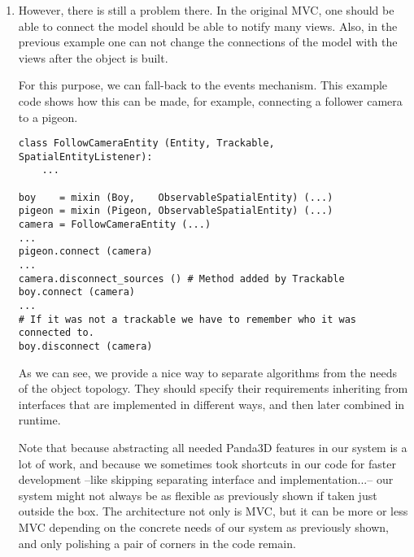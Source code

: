 \documentclass[a4paper,10pt]{article}
\begin{document}
\begin{enumerate}
  But, as the previous code shows, one can build the desired class on
  runtime mixing the needed entity components. For this, we provide
  the utility function \texttt{mixin} that creates a new class from a
  set of bases. For example, this code could be valid\footnote{We do
    not implement networked game, so some of the classes described are
    ficticious.}:

{\footnotesize
\begin{verbatim}
if game_is_local:
    pigeon = mixin (BoidEntity, DynamicPhysicalEntity, ActorEntity) (...)
elif game_is_client:
    pigeon = mixin (ActorEntity, RemotePhysicalEntity) (...)
elif game_is_server:
    pigeon = mixin (BoidEntity, DynamicPhysicalEntity, ServerPhysicalEntity) (...)
pigeon.set_position (100, 100, 100)
\end{verbatim}
}

In that way, the \emph{call-next-method} mechanism would make sure
that when a manipulation method is called on this model+view mixin
object it propagates correctly through all the hierarchy notifying the
views.

\item However, there is still a problem there. In the original MVC,
  one should be able to connect the model should be able to notify
  many views. Also, in the previous example one can not change the
  connections of the model with the views after the object is built.

  For this purpose, we can fall-back to the events mechanism. This
  example code shows how this can be made, for example, connecting a
  follower camera to a pigeon.

{\footnotesize
\begin{verbatim}
class FollowCameraEntity (Entity, Trackable, SpatialEntityListener):
    ...

boy    = mixin (Boy,    ObservableSpatialEntity) (...)
pigeon = mixin (Pigeon, ObservableSpatialEntity) (...)
camera = FollowCameraEntity (...)
...
pigeon.connect (camera)
...
camera.disconnect_sources () # Method added by Trackable
boy.connect (camera)
...
# If it was not a trackable we have to remember who it was connected to.
boy.disconnect (camera) 
\end{verbatim}
}

As we can see, we provide a nice way to separate algorithms from the
needs of the object topology. They should specify their requirements
inheriting from interfaces that are implemented in different ways, and
then later combined in runtime.

Note that because abstracting all needed Panda3D features in our
system is a lot of work, and because we sometimes took shortcuts in
our code for faster development --like skipping separating interface
and implementation...-- our system might not always be as flexible as
previously shown if taken just outside the box. The architecture not
only is MVC, but it can be more or less MVC depending on the concrete
needs of our system as previously shown, and only polishing a pair of
corners in the code remain.

\end{enumerate}
\end{document}
